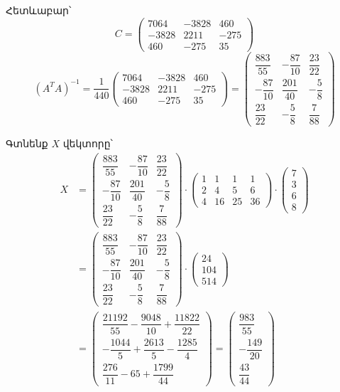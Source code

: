 \documentclass[12pt,a4paper]{article}
\numberwithin{equation}{section}
\numberwithin{figure}{section}
\begin{document}
Հետևաբար՝
\[
C =
\begin{pmatrix}
7064 & -3828 & 460 \\
-3828 & 2211 & -275 \\
460 & -275 & 35
\end{pmatrix}
\]
\[
(A^T A)^{-1} = \frac{1}{440}
\begin{pmatrix}
7064 & -3828 & 460 \\
-3828 & 2211 & -275 \\
460 & -275 & 35
\end{pmatrix}
=
\begin{pmatrix}
\dfrac{883}{55} & -\dfrac{87}{10} & \dfrac{23}{22} \\[10pt]
-\dfrac{87}{10} & \dfrac{201}{40} & -\dfrac{5}{8} \\[10pt]
\dfrac{23}{22} & -\dfrac{5}{8} & \dfrac{7}{88}
\end{pmatrix}
\]

Գտնենք $X$ վեկտորը՝
\begin{align*}
X &=
\begin{pmatrix}
\dfrac{883}{55} & -\dfrac{87}{10} & \dfrac{23}{22} \\[10pt]
-\dfrac{87}{10} & \dfrac{201}{40} & -\dfrac{5}{8} \\[10pt]
\dfrac{23}{22} & -\dfrac{5}{8} & \dfrac{7}{88}
\end{pmatrix}
\cdot
\begin{pmatrix}
1 & 1 & 1 & 1 \\
2 & 4 & 5 & 6 \\
4 & 16 & 25 & 36
\end{pmatrix}
\cdot
\begin{pmatrix}
7 \\
3 \\
6 \\
8
\end{pmatrix} \\[12pt]
&=
\begin{pmatrix}
\dfrac{883}{55} & -\dfrac{87}{10} & \dfrac{23}{22} \\[10pt]
-\dfrac{87}{10} & \dfrac{201}{40} & -\dfrac{5}{8} \\[10pt]
\dfrac{23}{22} & -\dfrac{5}{8} & \dfrac{7}{88}
\end{pmatrix}
\cdot
\begin{pmatrix}
24 \\
104 \\
514
\end{pmatrix} \\[12pt]
&=
\begin{pmatrix}
\dfrac{21192}{55} - \dfrac{9048}{10} + \dfrac{11822}{22} \\[10pt]
-\dfrac{1044}{5} + \dfrac{2613}{5} - \dfrac{1285}{4} \\[10pt]
\dfrac{276}{11} - 65 + \dfrac{1799}{44}
\end{pmatrix}
=
\begin{pmatrix}
\dfrac{983}{55} \\[10pt]
-\dfrac{149}{20} \\[10pt]
\dfrac{43}{44}
\end{pmatrix}
\end{align*}
\end{document}
